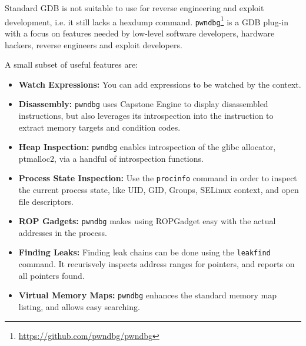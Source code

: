 \documentclass{article}
\begin{document}
Standard GDB is not suitable to use for reverse engineering and exploit development, i.e. it still lacks a hexdump 
command. \texttt{pwndbg}\footnote{\url{https://github.com/pwndbg/pwndbg}} is a GDB plug-in with a focus on features needed by low-level software developers, hardware 
hackers, reverse engineers and exploit developers. 

A small subset of useful features are:
\begin{itemize}
\item{\textbf{Watch Expressions:}} You can add expressions to be watched by the context.
\item{\textbf{Disassembly:}} \texttt{pwndbg} uses Capstone Engine to display disassembled instructions, but also 
leverages its introspection into the instruction to extract memory targets and condition codes.
\item{\textbf{Heap Inspection:}} \texttt{pwndbg} enables introspection of the glibc allocator, ptmalloc2, via a 
handful of introspection functions.
\item{\textbf{Process State Inspection:}} Use the \texttt{procinfo} command in order to inspect the current process state, 
like UID, GID, Groups, SELinux context, and open file descriptors.
\item{\textbf{ROP Gadgets:}} \texttt{pwndbg} makes using ROPGadget easy with the actual addresses in the process.
\item{\textbf{Finding Leaks:}} Finding leak chains can be done using the \texttt{leakfind} command. It recurisvely 
inspects address ranges for pointers, and reports on all pointers found.
\item{\textbf{Virtual Memory Maps:}} \texttt{pwndbg} enhances the standard memory map listing, and allows easy searching.
\end{itemize}
\end{document}
